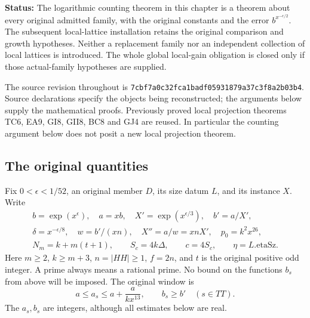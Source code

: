 \documentclass[11pt,a4paper]{article}
\numberwithin{equation}{section}
\theoremstyle{remark}\newtheorem{remark}[theorem]{Remark}
\newcommand{\status}[1]{\textbf{Status:} #1}
\begin{document}
\status{The logarithmic counting theorem in this chapter is a theorem
about every original admitted family, with the original constants and
the error \(b^{x^{-\epsilon/2}}\). The subsequent local-lattice
installation retains the original comparison and growth hypotheses.
Neither a replacement family nor an independent collection of local
lattices is introduced. The whole global local-gain obligation is
closed only if those actual-family hypotheses are supplied.}

The source revision throughout is
\texttt{7cbf7a0c32fca1badf05931879a37c3f8a2b03b4}.
Source declarations specify the objects being reconstructed; the
arguments below supply the mathematical proofs. Previously proved
local projection theorems TC6, EA9, GI8, GII8, BC8 and GJ4 are reused.
In particular the counting argument below does not posit a new local
projection theorem.

\subsection{The original quantities}

Fix \(0<\epsilon<1/52\), an original member \(D\), its size datum \(L\),
and its instance \(X\). Write
\[
 \begin{gathered}
 b=\exp(x^\epsilon),\quad a=xb,\quad
 X'=\exp(x^{\epsilon/3}),\quad b'=a/X',\\
 \delta=x^{-\epsilon/8},\quad
 w=b'/(xn),\quad X''=a/w=xnX',\quad
 p_0=k^2x^{26},\\
 N_m=k+m(t+1),\qquad S_c=4k\Delta,\qquad c=4S_c,
 \qquad \eta=L.\mathrm{etaSz}.
 \end{gathered}                                                    \tag{GLG.1}
\]
Here \(m\ge2\), \(k\ge m+3\), \(n=|HH|\ge1\), \(f=2n\),
and \(t\) is the original positive odd integer. A prime always means
a rational prime. No bound on the functions \(b_s\) from above will
be imposed. The original window is
\[
 a\le a_s\le a+\frac{a}{kx^{13}},\qquad b_s\ge b'
                         \quad(s\in TT).                         \tag{GLG.2}
\]
The \(a_s,b_s\) are integers, although all estimates below are real.
\end{document}

